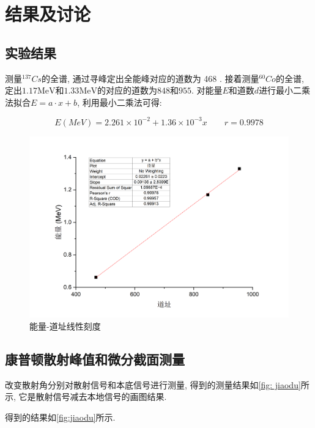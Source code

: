 \documentclass[font=default]{mpltx}
\begin{document}
\section{结果及讨论}

  \subsection{实验结果}

    测量${^{137}Cs}$的全谱, 通过寻峰定出全能峰对应的道数为 468 . 接着测量${^{60}Co}$的全谱, 定出$1.17\text{MeV}$和$1.33\text{MeV}$的对应的道数为$848$和$955$.
    对能量$E$和道数$d$进行最小二乘法拟合$E = a \cdot x + b $, 
    利用最小二乘法可得: 

	  \begin{equation}
		  E(MeV)=2.261 \times 10^{-2}+1.36 \times 10^{-3} x\qquad r=0.9978
	  \end{equation}

    \begin{figure}[htbp]
      \centering
      \includegraphics[width=0.85\linewidth]{fig/nihe.png}
      \caption{能量-道址线性刻度}
      \label{fig:nihe}
    \end{figure}

    \subsection{康普顿散射峰值和微分截面测量}

    改变散射角分别对散射信号和本底信号进行测量,  得到的测量结果如\autoref{fig: jiaodu}所示, 它是散射信号减去本地信号的画图结果. 
    
    得到的结果如\autoref{fig:jiaodu}所示.
\end{document}
